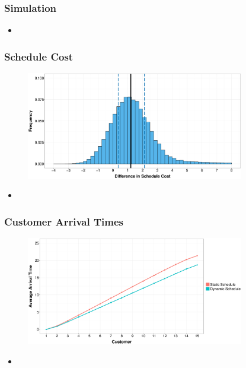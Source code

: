 \documentclass{beamer}
\begin{document}
\begin{frame}
	\frametitle{Simulation}

	\begin{itemize}
		\item 
	\end{itemize}
\end{frame}

\begin{frame}
	\frametitle{Schedule Cost}

	\begin{figure}
		\centering
		\includegraphics[width=0.85\textwidth]{Cost_Hist_Diff.eps}
	\end{figure}

	\begin{itemize}
		\item 
	\end{itemize}
\end{frame}

\begin{frame}
	\frametitle{Customer Arrival Times}

	\begin{figure}
		\centering
		\includegraphics[width=0.85\textwidth]{AT_Line.eps}
	\end{figure}

	\begin{itemize}
		\item 
	\end{itemize}
\end{frame}
\end{document}
